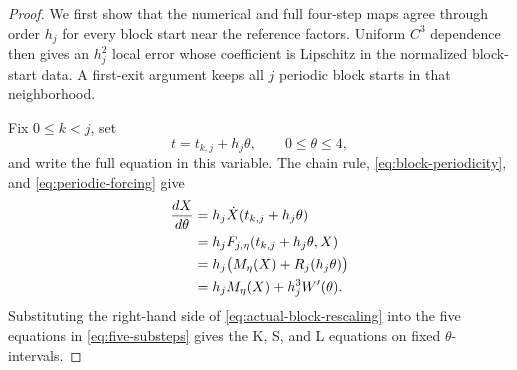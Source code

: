 \documentclass[10pt,a4paper]{amsart}
\numberwithin{equation}{section}
\begin{document}
\begin{proof}
We first show that the numerical and full four-step maps agree through
order $h_j$ for every block start near the reference factors.  Uniform
$C^3$ dependence then gives an $h_j^2$ local error whose coefficient is
Lipschitz in the normalized block-start data.  A first-exit argument
keeps all $j$ periodic block starts in that neighborhood.

Fix $0\le k<j$, set
\[
 t=t_{k,j}+h_j\theta,
 \qquad 0\le\theta\le4,
\]
and write the full equation in this variable.  The chain rule,
\eqref{eq:block-periodicity}, and \eqref{eq:periodic-forcing} give
\begin{align}
 \frac{dX}{d\theta}
 &=h_j\dot X(t_{k,j}+h_j\theta)\notag\\
 &=h_jF_{j,\eta}(t_{k,j}+h_j\theta,X)\notag\\
 &=h_j\bigl(M_\eta(X)+R_j(h_j\theta)\bigr)\notag\\
 &=h_jM_\eta(X)+h_j^3W'(\theta).
 \label{eq:actual-block-rescaling}
\end{align}
Substituting the right-hand side of
\eqref{eq:actual-block-rescaling} into the five equations in
\eqref{eq:five-substeps} gives the K, S, and L equations on fixed
$\theta$-intervals.


\end{proof}
\end{document}

